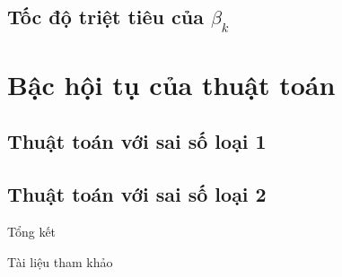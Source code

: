 \documentclass[aspectratio=169]{beamer}
\let\realsection\section
\let\realsubsection\subsection
\let\realsubsubsection\subsubsection
\renewcommand{\subsection}{\realsubsubsection}
\renewcommand{\section}{\realsubsection}
\newcommand{\chapter}{\realsection}
\begin{document}
    \section{Tốc độ triệt tiêu của $\beta_k$}
    \begin{frame}[allowframebreaks]
    
    \end{frame}
    \chapter{Bậc hội tụ của thuật toán}
    
    \section{Thuật toán với sai số loại 1}\label{sec:type1}
    \begin{frame}[allowframebreaks]
    
    \end{frame}
    \section{Thuật toán với sai số loại 2}\label{sec:type2}
    \begin{frame}[allowframebreaks]
    
    \end{frame}
    \begin{frame}{Tổng kết}
    
    \end{frame}
    \begin{frame}[plain]{Tài liệu tham khảo}
        
        
    \end{frame}
\end{document}
